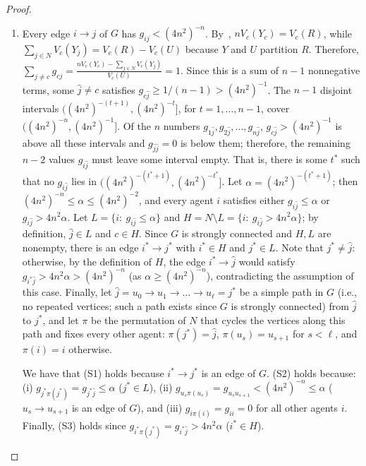 \documentclass[11pt]{article}
\theoremstyle{plain}
\theoremstyle{definition}
\theoremstyle{plain}
\begin{document}
\begin{proof}
\begin{enumerate}[leftmargin=*]
    (S1) holds because $i^* \to j^*$ is an edge of $G$, and (S2) holds trivially since $g_{kk}=0\le\alpha$. Finally, $g_{i^*j^*} \ge (4n^2)^{-n} = 4n^2\alpha$ so (S3) holds as well.
    \item Every edge $i\to j$ of $G$ has $g_{ij}<(4n^2)^{-n}$. By~, $nV_c(Y_c)=V_c(R)$, while $\sum_{j\in N}V_c(Y_j)=V_c(R)-V_c(U)$ because $Y$ and $U$ partition $R$. Therefore, $\sum_{j\ne c}g_{cj}= \frac{nV_c(Y_c)-\sum_{j\in N}V_c(Y_j)}{V_c(U)}=1$. Since this is a sum of $n-1$ nonnegative terms, some $\hat{j} \ne c$ satisfies $g_{c\hat{j}}\ge 1/(n-1)>(4n^2)^{-1}$. The $n-1$ disjoint intervals $( (4n^2)^{-(t+1)},(4n^2)^{-t}]$, for $t=1,\dots,n-1$, cover $((4n^2)^{-n},(4n^2)^{-1}]$. Of the $n$ numbers $g_{1\hat{j}}, g_{2\hat{j}},\dots,g_{n\hat{j}}$, $g_{c\hat{j}} > (4n^2)^{-1}$ is above all these intervals and $g_{\hat{j}\hat{j}} = 0$ is below them; therefore, the remaining $n-2$ values $g_{i\hat{j}}$ must leave some interval empty. That is, there is some $t^*$ such that no $g_{i\hat{j}}$ lies in $((4n^2)^{-(t^*+1)},(4n^2)^{-t^*}]$. Let $\alpha=(4n^2)^{-(t^*+1)}$; then $(4n^2)^{-n}\le\alpha\le(4n^2)^{-2}$, and every agent $i$ satisfies either $g_{i\hat{j}}\le\alpha$ or $g_{i\hat{j}}>4n^2\alpha$. Let $L=\{i:\ g_{i\hat{j}}\le\alpha\}$ and $H=N\setminus L=\{i:\ g_{i\hat{j}}>4n^2\alpha\}$; by definition, $\hat{j} \in L$ and $c\in H$. Since $G$ is strongly connected and $H,L$ are nonempty, there is an edge $i^* \to j^*$ with $i^* \in H$ and $j^* \in L$. Note that $j^* \ne \hat{j}$: otherwise, by the definition of $H$, the edge $i^* \to \hat{j}$ would satisfy $g_{i^* \hat{j}} > 4n^2\alpha > (4n^2)^{-n}$ (as $\alpha\ge(4n^2)^{-n}$), contradicting the assumption of this case.
    Finally, let $\hat{j} = u_0 \rightarrow u_1 \rightarrow \dots \rightarrow u_{\ell} = j^*$ be a simple path in $G$ (i.e., no repeated vertices; such a path exists since $G$ is strongly connected) from $\hat{j}$ to $j^*$, and let $\pi$ be the permutation of $N$ that cycles the vertices along this path and fixes every other agent: $\pi(j^*)=\hat{j}$, $\pi(u_s)=u_{s+1}$ for $s<\ell$, and $\pi(i)=i$ otherwise.

    We have that (S1) holds because $i^* \to j^*$ is an edge of $G$. (S2) holds because: (i) $g_{j^*\pi(j^*)} = g_{j^*\hat{j}} \leq \alpha$ ($j^* \in L$), (ii) $g_{u_s \pi(u_s)} = g_{u_s u_{s+1}} < (4n^2)^{-n} \leq \alpha$ ($u_s \to u_{s+1}$ is an edge of $G$), and (iii) $g_{i \pi(i)} = g_{ii} = 0$ for all other agents $i$. Finally, (S3) holds since $g_{i^* \pi(j^*)} = g_{i^*\hat{j}} > 4n^2\alpha$ ($i^* \in H$).

    
\end{enumerate}

\end{proof}
\end{document}

